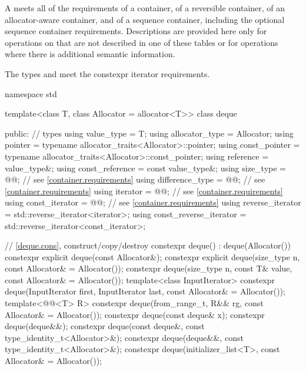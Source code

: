 \pnum
A  meets all of the requirements
of a container,
of a reversible container,
of an allocator-aware container, and
of a sequence container,
including the optional sequence container requirements.
Descriptions are provided here only for operations on
that are not described in one of these tables
or for operations where there is additional semantic information.

\pnum
The types  and  meet
the constexpr iterator requirements.

\begin{codeblock}
namespace std {
  template<class T, class Allocator = allocator<T>>
  class deque {
  public:
    // types
    using value_type             = T;
    using allocator_type         = Allocator;
    using pointer                = typename allocator_traits<Allocator>::pointer;
    using const_pointer          = typename allocator_traits<Allocator>::const_pointer;
    using reference              = value_type&;
    using const_reference        = const value_type&;
    using size_type              = @@; // see \ref{container.requirements}
    using difference_type        = @@; // see \ref{container.requirements}
    using iterator               = @@; // see \ref{container.requirements}
    using const_iterator         = @@; // see \ref{container.requirements}
    using reverse_iterator       = std::reverse_iterator<iterator>;
    using const_reverse_iterator = std::reverse_iterator<const_iterator>;

    // \ref{deque.cons}, construct/copy/destroy
    constexpr deque() : deque(Allocator()) { }
    constexpr explicit deque(const Allocator&);
    constexpr explicit deque(size_type n, const Allocator& = Allocator());
    constexpr deque(size_type n, const T& value, const Allocator& = Allocator());
    template<class InputIterator>
      constexpr deque(InputIterator first, InputIterator last, const Allocator& = Allocator());
    template<@@<T> R>
      constexpr deque(from_range_t, R&& rg, const Allocator& = Allocator());
    constexpr deque(const deque& x);
    constexpr deque(deque&&);
    constexpr deque(const deque&, const type_identity_t<Allocator>&);
    constexpr deque(deque&&, const type_identity_t<Allocator>&);
    constexpr deque(initializer_list<T>, const Allocator& = Allocator());

}}
\end{codeblock}
